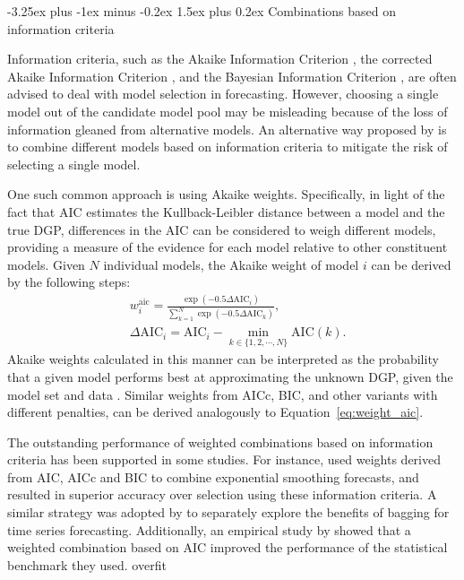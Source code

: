 \documentclass[11pt]{article}
\makeatletter
\renewcommand{\paragraph}{\@startsection{paragraph}{4}{0ex}%
   {-3.25ex plus -1ex minus -0.2ex}%
   {1.5ex plus 0.2ex}%
   {\normalfont\normalsize\bfseries}}
\makeatother
\begin{document}
\paragraph{Combinations based on information criteria}

Information criteria, such as the Akaike Information Criterion \citep[AIC,][]{Akaike1974-ya}, the corrected Akaike Information Criterion \citep[AICc,][]{Sugiura1978-xm}, and the Bayesian Information Criterion \citep[BIC,][]{Schwarz1978-cz}, are often advised to deal with model selection in forecasting. However, choosing a single model out of the candidate model pool may be misleading because of the loss of information gleaned from alternative models. An alternative way proposed by \cite{Burnham2002-us} is to combine different models based on information criteria to mitigate the risk of selecting a single model.

One such common approach is using Akaike weights. Specifically, in light of the fact that AIC estimates the Kullback-Leibler distance \citep{Kullback1951-hl} between a model and the true DGP, differences in the AIC can be considered to weigh different models, providing a measure of the evidence for each model relative to other constituent models. Given $N$ individual models, the Akaike weight of model $i$ can be derived by the following steps:
\begin{align}
&w_{i}^{\text{aic}}=\frac{\exp (-0.5 \Delta \mathrm{AIC}_{i})}{\sum_{k=1}^{N} \exp \left(-0.5 \Delta \mathrm{AIC}_{k}\right)}, \label{eq:weight_aic} \\
&\Delta \mathrm{AIC}_{i}=\mathrm{AIC}_{i}-\min _{k \in \{1,2,\cdots,N\}} \mathrm{AIC}(k). \nonumber
\end{align}
Akaike weights calculated in this manner can be interpreted as the probability that a given model performs best at approximating the unknown DGP, given the model set and data \citep{Kolassa2011-ai}. Similar weights from AICc, BIC, and other variants with different penalties, can be derived analogously to Equation~\eqref{eq:weight_aic}.

The outstanding performance of weighted combinations based on information criteria has been supported in some studies. For instance, \cite{Kolassa2011-ai} used weights derived from AIC, AICc and BIC to combine exponential smoothing forecasts, and resulted in superior accuracy over selection using these information criteria. A similar strategy was adopted by \cite{Petropoulos2018-fw} to separately explore the benefits of bagging for time series forecasting. Additionally, an empirical study by \cite{Petropoulos2018-ad} showed that a weighted combination based on AIC improved the performance of the statistical benchmark they used.
{\color{red}overfit}
\end{document}
